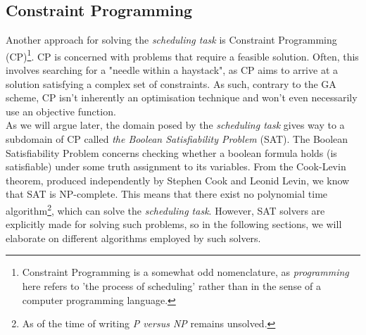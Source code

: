 \subsection{Constraint Programming}
Another approach for solving the \textit{scheduling task} is Constraint Programming (CP)\footnote{Constraint Programming is a somewhat odd nomenclature, as \textit{programming} here refers to 'the process of scheduling' rather than in the sense of a computer programming language.}. CP is concerned with problems that require a feasible solution. Often, this involves searching for a "needle within a haystack", as CP aims to arrive at a solution satisfying a complex set of constraints. As such, contrary to the GA scheme, CP isn't inherently an optimisation technique and won't even necessarily use an objective function.
\\
As we will argue later, the domain posed by the \textit{scheduling task} gives way to a subdomain of CP called \textit{the Boolean Satisfiability Problem} (SAT). The Boolean Satisfiability Problem concerns checking whether a boolean formula holds (is satisfiable) under some truth assignment to its variables. From the Cook-Levin theorem, produced independently by Stephen Cook\cite{cook-bool-SAT} and Leonid Levin\cite{Levin-bool-SAT}, we know that SAT is NP-complete. This means that there exist no polynomial time algorithm\footnote{As of the time of writing \textit{P versus NP}\cite{Wiki-P-vs-NP} remains unsolved.}, which can solve the \textit{scheduling task}. However, SAT solvers are explicitly made for solving such problems, so in the following sections, we will elaborate on different algorithms employed by such solvers.

